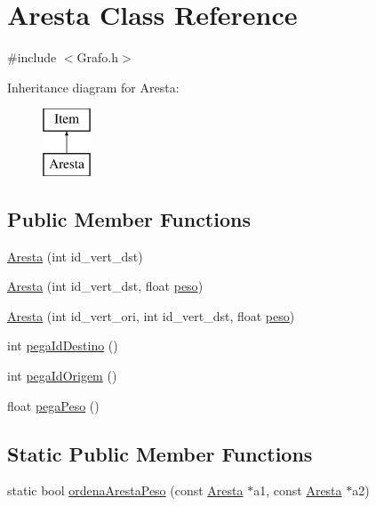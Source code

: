 \hypertarget{class_aresta}{\section{Aresta Class Reference}
\label{class_aresta}
}


{\ttfamily \#include $<$Grafo.\-h$>$}

Inheritance diagram for Aresta\-:\begin{figure}[H]
\begin{center}
\leavevmode
\includegraphics[height=2.000000cm]{class_aresta}
\end{center}
\end{figure}
\subsection*{Public Member Functions}
\begin{DoxyCompactItemize}
\item 
\hyperlink{class_aresta_ac4973cc1f876367f550867a6f9585710}{Aresta} (int id\-\_\-vert\-\_\-dst)
\item 
\hyperlink{class_aresta_ae98b01abb56c5edfe67ee8fb934d4e8a}{Aresta} (int id\-\_\-vert\-\_\-dst, float \hyperlink{class_aresta_a5cbe0615f1b11fc59b24743c751c7c89}{peso})
\item 
\hyperlink{class_aresta_af2ed777b341fb131f9914724a2ac034e}{Aresta} (int id\-\_\-vert\-\_\-ori, int id\-\_\-vert\-\_\-dst, float \hyperlink{class_aresta_a5cbe0615f1b11fc59b24743c751c7c89}{peso})
\item 
int \hyperlink{class_aresta_a826de2a611158755e0c3945c29d8dba7}{pega\-Id\-Destino} ()
\item 
int \hyperlink{class_aresta_ad605bd3f09038baf4623699187a31d9b}{pega\-Id\-Origem} ()
\item 
float \hyperlink{class_aresta_aabc9bf8cd3c86e3b0535b83a2495ab74}{pega\-Peso} ()
\end{DoxyCompactItemize}
\subsection*{Static Public Member Functions}
\begin{DoxyCompactItemize}
\item 
static bool \hyperlink{class_aresta_a5397827613569c129c2ba3385ce0665f}{ordena\-Aresta\-Peso} (const \hyperlink{class_aresta}{Aresta} $\ast$a1, const \hyperlink{class_aresta}{Aresta} $\ast$a2)
\end{DoxyCompactItemize}
